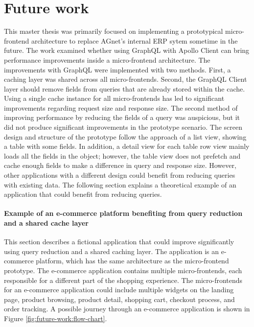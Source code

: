 \chapter{Future work}\label{chapter:future-work}

This master thesis was primarily focused on implementing a prototypical micro-frontend architecture to replace AGnet's internal \ac{ERP} sytem sometime in the future. The work examined whether using GraphQL with Apollo Client can bring performance improvements inside a micro-frontend architecture. The improvements with GraphQL were implemented with two methods. First, a caching layer was shared across all micro-frontends. Second, the GraphQL Client layer should remove fields from queries that are already stored within the cache. Using a single cache instance for all micro-frontends has led to significant improvements regarding request size and response size. The second method of improving performance by reducing the fields of a query was auspicious, but it did not produce significant improvements in the prototype scenario. The screen design and structure of the prototype follow the approach of a list view, showing a table with some fields. In addition, a detail view for each table row view mainly loads all the fields in the object; however, the table view does not prefetch and cache enough fields to make a difference in query and response size. However, other applications with a different design could benefit from reducing queries with existing data. The following section explains a theoretical example of an application that could benefit from reducing queries.

\subsubsection{Example of an e-commerce platform benefiting from query reduction and a shared cache layer}

This section describes a fictional application that could improve significantly using query reduction and a shared caching layer. The application is an e-commerce platform, which has the same architecture as the micro-frontend prototype. The e-commerce application contains multiple micro-frontends, each responsible for a different part of the shopping experience. The micro-frontends for an e-commerce application could include multiple widgets on the landing page, product browsing, product detail, shopping cart, checkout process, and order tracking. A possible journey through an e-commerce application is shown in Figure \ref{fig:future-work:flow-chart}.

